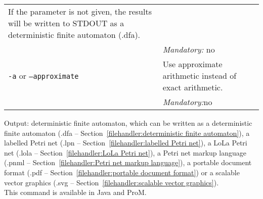 {\begin{tabularx}{\linewidth}{lX}
If the parameter is not given, the results will be written to STDOUT as a deterministic finite automaton (.dfa).\\
&\textit{Mandatory:} \quad no\\
\texttt{-a} or \texttt{--approximate} & Use approximate arithmetic instead of exact arithmetic.\\
&\textit{Mandatory:}\quad no\\
\bottomrule
\end{tabularx}
\noindent Output: deterministic finite automaton, which can be written as a deterministic finite automaton (.dfa -- Section~\ref{filehandler:deterministic finite automaton}), a labelled Petri net (.lpn -- Section~\ref{filehandler:labelled Petri net}), a LoLa Petri net (.lola -- Section~\ref{filehandler:LoLa Petri net}), a Petri net markup language (.pnml -- Section~\ref{filehandler:Petri net markup language}), a portable document format (.pdf -- Section~\ref{filehandler:portable document format}) or a scalable vector graphics (.svg -- Section~\ref{filehandler:scalable vector graphics}).
\\This command is available in Java and ProM.
}
